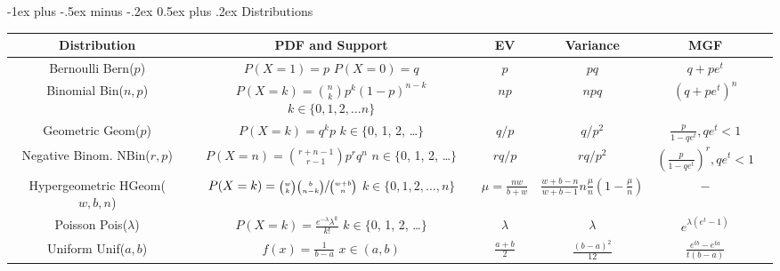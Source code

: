 \documentclass[10pt,landscape]{article}
\makeatletter
\theoremstyle{definition}
\newcommand{\Bern}{\textrm{Bern}}
\newcommand{\Bin}{\textrm{Bin}}
\newcommand{\Pois}{\textrm{Pois}}
\newcommand{\Unif}{\textrm{Unif}}
\newcommand{\Geom}{\textrm{Geom}}
\newcommand{\NBin}{\textrm{NBin}}
\newcommand{\Hypergeometric}{\textrm{HGeom}}
\renewcommand{\section}{\@startsection{section}{1}{0mm}%
                                {-1ex plus -.5ex minus -.2ex}%
                                {0.5ex plus .2ex}%
                                {\normalfont\large\bfseries}}
\makeatother
\begin{document}
\begin{center}

\section{Distributions}

\renewcommand{\arraystretch}{3}
\begin{tabular}{cccccc}
\textbf{Distribution} & \textbf{PDF and Support} & \textbf{EV}  & \textbf{Variance} & \textbf{MGF}\\
\hline \hline
\shortstack{Bernoulli \\ \Bern($p$)} & \shortstack{$P(X=1) = p$ \\$ P(X=0) = q$} & $p$ & $pq$ & $q + pe^t$ \\
\hline
\shortstack{Binomial \\ \Bin($n, p$)} & \shortstack{$P(X=k) = {n \choose k}p^k(1-p)^{n-k}$  \\ $k \in \{0, 1, 2, \dots n\}$}& $np$ & $npq$ & $(q + pe^t)^n$ \\
\hline
\shortstack{Geometric \\ \Geom($p$)} & \shortstack{$P(X=k) = q^kp$  \\ $k \in \{$0, 1, 2, \dots $\}$}& $q/p$ & $q/p^2$ & $\frac{p}{1-qe^t}, qe^t < 1$\\
\hline
\shortstack{Negative Binom. \\ \NBin($r, p$)} & \shortstack{$P(X=n) = {r + n - 1 \choose r -1}p^rq^n$ \\ $n \in \{$0, 1, 2, \dots $\}$} & $rq/p$ & $rq/p^2$ &  $(\frac{p}{1-qe^t})^r, qe^t < 1$\\
\hline
\shortstack{Hypergeometric \\ \Hypergeometric($w, b, n$)} & \shortstack{$P(X=k) = \sfrac{{w \choose k}{b \choose n-k}}{{w + b \choose n}}$ \\ $k \in \{0, 1, 2, \dots,  n\}$} & $\mu = \frac{nw}{b+w}$ &$\frac{w+b-n}{w+b-1}n\frac{\mu}{n}(1 - \frac{\mu}{n})$& $-$  \\
\hline
\shortstack{Poisson \\ \Pois($\lambda$)} & \shortstack{$P(X=k) = \frac{e^{-\lambda}\lambda^k}{k!}$ \\ $k \in \{$0, 1, 2, \dots $\}$} & $\lambda$ & $\lambda$ & $e^{\lambda(e^t-1)}$ \\
\hline
\hline
\shortstack{Uniform \\ \Unif($a, b$)} & \shortstack{$ f(x) = \frac{1}{b-a}$ \\$ x \in (a, b) $} & $\frac{a+b}{2}$ & $\frac{(b-a)^2}{12}$ &  $\frac{e^{tb}-e^{ta}}{t(b-a)}$\\

\end{tabular}
\end{center}
\end{document}
